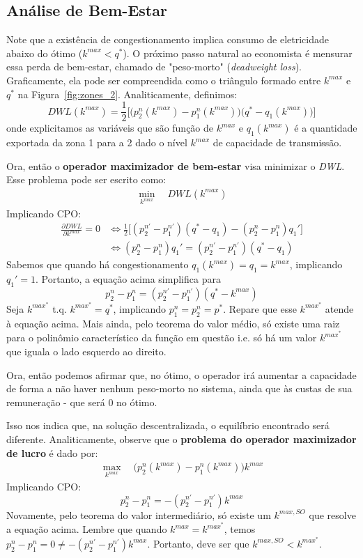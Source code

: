 \subsection{Análise de Bem-Estar}
Note que a existência de congestionamento implica consumo de eletricidade abaixo do ótimo ($k^{max}<q^*$). O próximo passo natural ao economista é mensurar essa perda de bem-estar, chamado de "peso-morto" (\textit{deadweight loss}). Graficamente, ela pode ser compreendida como o triângulo formado entre $k^{max}$ e $q^*$ na Figura~\ref{fig:zones_2}. Analiticamente, definimos:
\[\textit{DWL}(k^{max}) = \frac{1}{2}\Big[\Big(p_2^n(k^{max})-p_1^n(k^{max})\Big)\Big(q^*-q_1(k^{max})\Big)\Big]\]
onde explicitamos as variáveis que são função de $k^{max}$ e $q_1(k^{max})$ é a quantidade exportada da zona 1 para a 2 dado o nível $k^{max}$ de capacidade de transmissão. 

Ora, então o \textbf{operador maximizador de bem-estar} visa minimizar o \textit{DWL}. Esse problema pode ser escrito como:
\begin{align*}
    \min_{k^{max}}\quad \textit{DWL}(k^{max})
\end{align*}
Implicando CPO:
\begin{align*}
    \frac{\partial\textit{DWL}}{\partial k^{max}} = 0 &\Longleftrightarrow \frac{1}{2}\Big[(p_2^{n'}-p_1^{n'})(q^*-q_1)-(p_2^n-p_1^n)q_{1}' \Big]\\
    &\Longleftrightarrow (p_2^n-p_1^n)q_{1}' = (p_2^{n'}-p_1^{n'})(q^*-q_1)
\end{align*}
Sabemos que quando há congestionamento $q_1(k^{max})=q_1=k^{max}$, implicando $q_1'=1$. Portanto, a equação acima simplifica para
\[p_2^n-p_1^n = (p_2^{n'}-p_1^{n'})(q^*-k^{max})\]
Seja $k^{max^*}$ t.q. $k^{max^*}=q^*$, implicando $p_1^n=p_2^n=p^*$. Repare que esse $k^{max^*}$ atende à equação acima. Mais ainda, pelo teorema do valor médio, só existe uma raiz para o polinômio característico da função em questão i.e. só há um valor $k^{max^*}$ que iguala o lado esquerdo ao direito.

Ora, então podemos afirmar que, no ótimo, o operador irá aumentar a capacidade de forma a não haver nenhum peso-morto no sistema, ainda que às custas de sua remuneração - que será 0 no ótimo.

Isso nos indica que, na solução descentralizada, o equilíbrio encontrado será diferente. Analiticamente, observe que o \textbf{problema do operador maximizador de lucro} é dado por:
\begin{align*}
    \max_{k^{max}}\quad \Big(p_2^n(k^{max})-p_1^n(k^{max})\Big)k^{max}
\end{align*}
Implicando CPO:
\[p_2^n-p_1^n=-(p_2^{n'}-p_1^{n'})k^{max}\]
Novamente, pelo teorema do valor intermediário, só existe um $k^{max,SO}$ que resolve a equação acima. Lembre que quando $k^{max}=k^{max^*}$, temos $p_2^n-p_1^n=0\neq -(p_2^{n'}-p_1^{n'})k^{max}$. Portanto, deve ser que $k^{max,SO}<k^{max^*}$.

